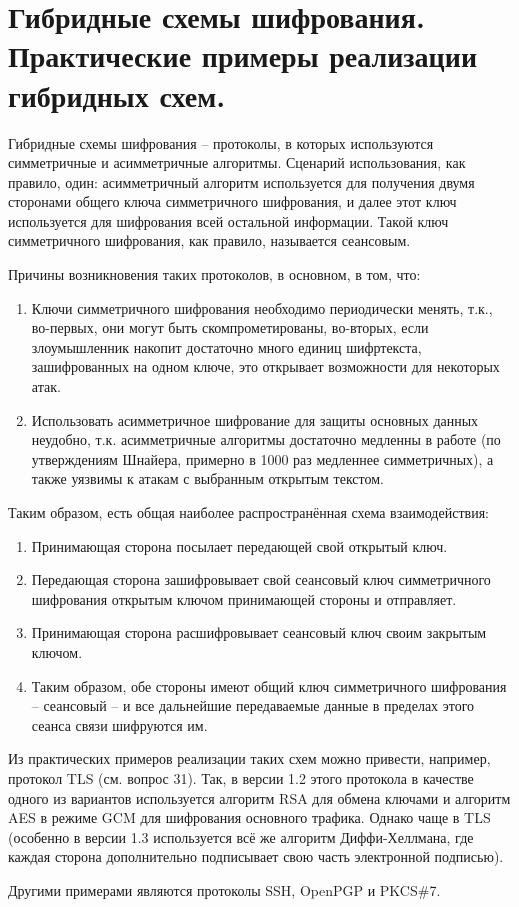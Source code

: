 \section{Гибридные схемы шифрования. Практические примеры реализации гибридных схем.}

Гибридные схемы шифрования -- протоколы, в которых используются  симметричные и асимметричные алгоритмы. Сценарий использования, как правило, один: асимметричный алгоритм используется для получения двумя сторонами общего ключа симметричного шифрования, и далее этот ключ используется для шифрования всей остальной информации. Такой ключ симметричного шифрования, как правило, называется сеансовым. 

Причины возникновения таких протоколов, в основном, в том, что:

\begin{enumerate}
	\item Ключи симметричного шифрования необходимо периодически менять, т.к., во-первых, они могут быть скомпрометированы, во-вторых, если злоумышленник накопит достаточно много единиц шифртекста, зашифрованных на одном ключе, это открывает возможности для некоторых атак.
	\item Использовать асимметричное шифрование для защиты основных данных неудобно, т.к. асимметричные алгоритмы достаточно медленны в работе (по утверждениям Шнайера, примерно в 1000 раз медленнее симметричных), а также уязвимы к атакам с выбранным открытым текстом.
\end{enumerate}

Таким образом, есть общая наиболее распространённая схема взаимодействия:

\begin{enumerate}
	\item Принимающая сторона посылает передающей свой открытый ключ.
	\item Передающая сторона зашифровывает свой сеансовый ключ симметричного шифрования открытым ключом принимающей стороны и отправляет.
	\item Принимающая сторона расшифровывает сеансовый ключ своим закрытым ключом.
	\item Таким образом, обе стороны имеют общий ключ симметричного шифрования -- сеансовый -- и все дальнейшие передаваемые данные в пределах этого сеанса связи шифруются им. 
\end{enumerate}

Из практических примеров реализации таких схем можно привести, например, протокол TLS (см. вопрос 31). Так, в версии 1.2 этого протокола в качестве одного из вариантов используется алгоритм RSA для обмена ключами и алгоритм AES в режиме GCM для шифрования основного трафика. Однако чаще в TLS (особенно в версии 1.3 используется всё же алгоритм Диффи-Хеллмана, где каждая сторона дополнительно подписывает свою часть электронной подписью).

Другими примерами являются протоколы SSH, OpenPGP и PKCS\#7.